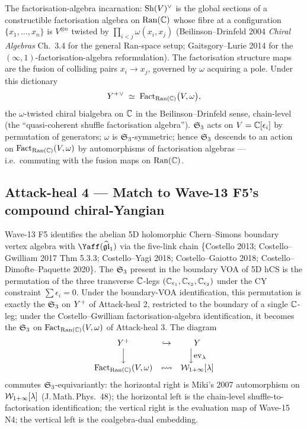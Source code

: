The factorisation-algebra incarnation: $\mathrm{Sh}(V)^{\vee}$ is the global
sections of a constructible factorisation algebra on $\mathrm{Ran}(\mathbb{C})$ whose
fibre at a configuration $\{x_{1}, \dots, x_{n}\}$ is
$V^{\otimes n}$ twisted by $\prod_{i < j} \omega(x_{i}, x_{j})$
(Beilinson--Drinfeld 2004 \emph{Chiral Algebras} Ch.~3.4 for the
general Ran-space setup; Gaitsgory--Lurie 2014 for the
$(\infty, 1)$-factorisation-algebra reformulation).  The factorisation
structure maps are the fusion of colliding pairs $x_{i} \to x_{j}$,
governed by $\omega$ acquiring a pole.  Under this dictionary
\[
  Y^{+}{}^{\vee}
   \;\simeq\;
   \mathrm{Fact}_{\mathrm{Ran}(\mathbb{C})}\bigl(V, \omega\bigr),
\]
the $\omega$-twisted chiral bialgebra on $\mathbb{C}$ in the Beilinson--Drinfeld
sense, chain-level (the ``quasi-coherent shuffle factorisation
algebra'').  $\mathfrak{S}_{3}$ acts on $V = \mathbb{C}[\epsilon_{i}]$ by permutation of
generators; $\omega$ is $\mathfrak{S}_{3}$-symmetric; hence $\mathfrak{S}_{3}$ descends to
an action on $\mathrm{Fact}_{\mathrm{Ran}(\mathbb{C})}(V, \omega)$ by automorphisms of
factorisation algebras --- i.e.\ commuting with the fusion maps on
$\mathrm{Ran}(\mathbb{C})$.

\subsection*{Attack-heal 4 --- Match to Wave-13 F5's compound chiral-Yangian}

Wave-13 F5 identifies the abelian 5D holomorphic Chern--Simons boundary
vertex algebra with $\Yaff(\gghone)$ via the five-link chain
\{Costello 2013; Costello--Gwilliam 2017 Thm 5.3.3;
Costello--Yagi 2018; Costello--Gaiotto 2018; Costello--Dimofte--Paquette
2020\}.  The $\mathfrak{S}_{3}$ present in the boundary VOA of 5D hCS is the
permutation of the three transverse $\mathbb{C}$-legs
$(\mathbb{C}_{\epsilon_{1}}, \mathbb{C}_{\epsilon_{2}}, \mathbb{C}_{\epsilon_{3}})$ under the
CY constraint $\sum \epsilon_{i} = 0$.  Under the boundary-VOA
identification, this permutation is exactly the $\mathfrak{S}_{3}$ on $Y^{+}$
of Attack-heal 2, restricted to the boundary of a single $\mathbb{C}$-leg;
under the Costello--Gwilliam factorisation-algebra identification, it
becomes the $\mathfrak{S}_{3}$ on $\mathrm{Fact}_{\mathrm{Ran}(\mathbb{C})}(V, \omega)$ of
Attack-heal 3.  The diagram
\[
  \begin{array}{ccc}
     Y^{+} & \hookrightarrow & Y \\
     \Big\downarrow & & \Big\downarrow \mathrm{ev}_{\lambda} \\
     \mathrm{Fact}_{\mathrm{Ran}(\mathbb{C})}(V, \omega) & \leftrightsquigarrow &
       \mathcal{W}_{1+\infty}[\lambda]
  \end{array}
\]
commutes $\mathfrak{S}_{3}$-equivariantly: the horizontal right is
Miki's 2007 automorphism on $\mathcal{W}_{1+\infty}[\lambda]$
(J.\,Math.\,Phys.~48); the horizontal left is the chain-level shuffle-to-
factorisation identification; the vertical right is the evaluation
map of Wave-15 N4; the vertical left is the coalgebra-dual embedding.

